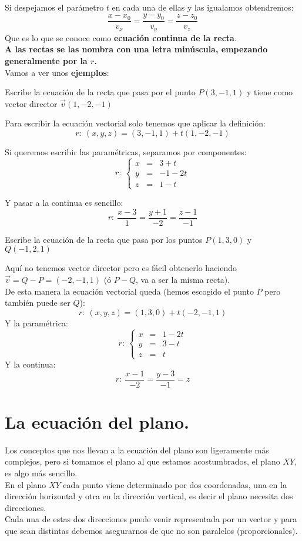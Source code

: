 \documentclass[a4paper,11pt,answers]{exam}
\begin{document}
Si despejamos el parámetro $t$ en cada una de ellas y las igualamos obtendremos:
\[\frac{x-x_0}{v_x} = \frac{y-y_0}{v_y} = \frac{z-z_0}{v_z}\]
Que es lo que se conoce como \textbf{ecuación continua de la recta}.\\

\textbf{A las rectas se las nombra con una letra minúscula, empezando generalmente por la $r$.}\\


Vamos a ver unos \textbf{ejemplos}:
\begin{questions}
	\question Escribe la ecuación de la recta que pasa por el punto $P(3,-1,1)$ y tiene como vector director $\vec{v}(1,-2,-1)$
	\begin{solution}
		Para escribir la ecuación vectorial solo tenemos que aplicar la definición:
		\[r:\ (x,y,z) = (3,-1,1) + t (1,-2,-1)\]
		
		Si queremos escribir las paramétricas, separamos por componentes:
		\[r:\ \left\lbrace
		\begin{array}{lcl}
			x &=& 3 + t\\
			y &=& -1 -2 t\\
			z &=& 1 - t
		\end{array}
		\right.\]
		
		Y pasar a la continua es sencillo:
		\[r:\ \frac{x - 3}{1} = \frac{y + 1}{-2} = \frac{z-1}{-1}\]
	\end{solution}

	\question Escribe la ecuación de la recta que pasa por los puntos $P(1, 3, 0)$ y $Q(-1,2,1)$
	\begin{solution}
		Aquí no tenemos vector director pero es fácil obtenerlo haciendo $\vec{v} = Q - P = (-2, -1,1)$ (ó $P -Q$, va a ser la misma recta).\\
		De esta manera la ecuación vectorial queda (hemos escogido el punto $P$ pero también puede ser $Q$):
		\[r:\ (x,y,z) = (1, 3, 0) + t(-2,-1,1)\]
		Y la paramétrica:
		\[r:\ \left\lbrace
		\begin{array}{lcl}
			x &=& 1-2t\\
			y &=& 3-t\\
			z &=& t
		\end{array}
		\right.\]
		Y la continua:
		\[r:\ \frac{x-1}{-2} = \frac{y-3}{-1} = z\]
	\end{solution}
\end{questions}
\section{La ecuación del plano.}
Los conceptos que nos llevan a la ecuación del plano son ligeramente más complejos, pero si tomamos el plano al que estamos acostumbrados, el plano $XY$, es algo más sencillo.\\
En el plano $XY$ cada punto viene determinado por dos coordenadas, una en la dirección horizontal y otra en la dirección vertical, es decir el plano necesita dos direcciones.\\
Cada una de estas dos direcciones puede venir representada por un vector y para que sean distintas debemos asegurarnos de que no son paralelos (proporcionales).\\
\end{document}
